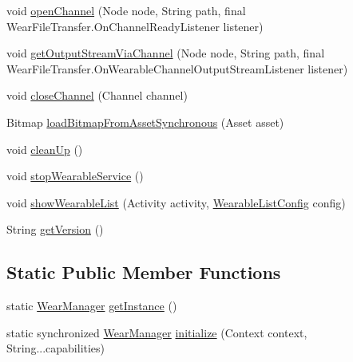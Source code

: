 \begin{DoxyCompactItemize}
\item 
void \hyperlink{classcom_1_1google_1_1devrel_1_1wcl_1_1WearManager_a80cd369af43c6f19a8433470eed04589}{open\+Channel} (Node node, String path, final Wear\+File\+Transfer.\+On\+Channel\+Ready\+Listener listener)
\item 
void \hyperlink{classcom_1_1google_1_1devrel_1_1wcl_1_1WearManager_a9f55f62796ce9aa183c151d85044063b}{get\+Output\+Stream\+Via\+Channel} (Node node, String path, final Wear\+File\+Transfer.\+On\+Wearable\+Channel\+Output\+Stream\+Listener listener)
\item 
void \hyperlink{classcom_1_1google_1_1devrel_1_1wcl_1_1WearManager_a8b25b2f519724bf268c276e9ab7895aa}{close\+Channel} (Channel channel)
\item 
Bitmap \hyperlink{classcom_1_1google_1_1devrel_1_1wcl_1_1WearManager_aff2666d2b72754de8d079850282ed8a3}{load\+Bitmap\+From\+Asset\+Synchronous} (Asset asset)
\item 
void \hyperlink{classcom_1_1google_1_1devrel_1_1wcl_1_1WearManager_aae268d37d354f957cf2ba645a1299c11}{clean\+Up} ()
\item 
void \hyperlink{classcom_1_1google_1_1devrel_1_1wcl_1_1WearManager_ab1fac2df063290c71ac555851a5066c6}{stop\+Wearable\+Service} ()
\item 
void \hyperlink{classcom_1_1google_1_1devrel_1_1wcl_1_1WearManager_a446c9ae3e23609bc16d87e4ece91ed72}{show\+Wearable\+List} (Activity activity, \hyperlink{classcom_1_1google_1_1devrel_1_1wcl_1_1widgets_1_1list_1_1WearableListConfig}{Wearable\+List\+Config} config)
\item 
String \hyperlink{classcom_1_1google_1_1devrel_1_1wcl_1_1WearManager_a74a9367281a0e6c0eccf2d2e7b427254}{get\+Version} ()
\end{DoxyCompactItemize}
\subsection*{Static Public Member Functions}
\begin{DoxyCompactItemize}
\item 
static \hyperlink{classcom_1_1google_1_1devrel_1_1wcl_1_1WearManager}{Wear\+Manager} \hyperlink{classcom_1_1google_1_1devrel_1_1wcl_1_1WearManager_a5e9a61518e44bb2c1a89706d51240661}{get\+Instance} ()
\item 
static synchronized \hyperlink{classcom_1_1google_1_1devrel_1_1wcl_1_1WearManager}{Wear\+Manager} \hyperlink{classcom_1_1google_1_1devrel_1_1wcl_1_1WearManager_ad167fb70251395681bf1ea569696bc2b}{initialize} (Context context, String...\+capabilities)
\end{DoxyCompactItemize}



